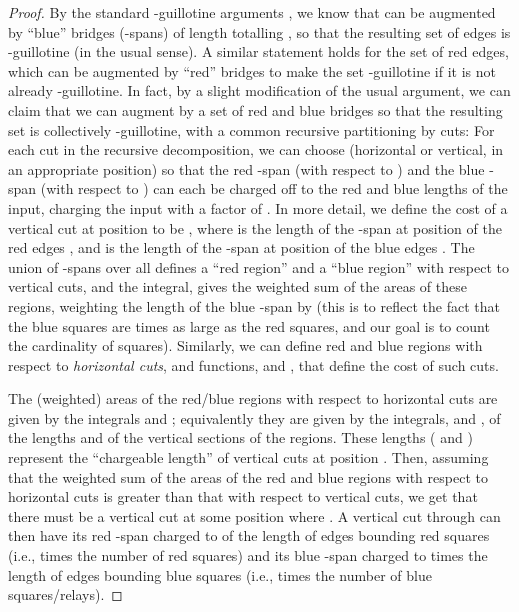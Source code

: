 \documentclass[11pt,a4paper]{article}
\theoremstyle{definition}
\theoremstyle{remark}
\begin{document}
\begin{enumerate}
\begin{proof}
By the standard -guillotine arguments \cite{mitchell99guillotine},
we know that  can be augmented by ``blue'' bridges (-spans) of
length totalling , so that the resulting set of
edges is -guillotine (in the usual sense).  A similar statement
holds for the set  of red edges, which can be augmented by
``red'' bridges to make the set -guillotine if it is not already
-guillotine.  In fact, by a slight modification of the usual
argument, we can claim that we can augment  by a set of
red and blue bridges so that the resulting set is collectively
-guillotine, with a common recursive partitioning by cuts: For each
cut  in the recursive decomposition, we can choose 
(horizontal or vertical, in an appropriate position) so that the red
-span (with respect to ) and the blue -span (with respect
to ) can each be charged off to the red and blue lengths of the
input, charging the input with a factor of .  In more detail,
we define the cost of a vertical cut at position  to be
, where  is the length of the -span at
position  of the red edges , and  is the length of the
-span at position  of the blue edges .  The union of
-spans over all  defines a ``red region'' and a ``blue region''
with respect to vertical cuts, and the integral,  gives the weighted sum of the areas of these
regions, weighting the length of the blue -span by  (this is
to reflect the fact that the blue squares are  times as large as
the red squares, and our goal is to count the cardinality of squares).
Similarly, we can define red and blue regions with respect to {\em
  horizontal cuts}, and functions,  and , that define
the cost of such cuts.

The (weighted) areas of the red/blue regions with respect to
horizontal cuts are given by the integrals  and
; equivalently they are given by the integrals,
 and , of the lengths
 and  of the vertical sections of the regions.  These
lengths ( and ) represent the ``chargeable length'' of
vertical cuts at position .  Then, assuming that the weighted sum
of the areas of the red and blue regions with respect to horizontal
cuts is greater than that with respect to vertical cuts, we get that
there must be a vertical cut at some position  where
.  A vertical
cut through  can then have its red -span charged to 
of the length of edges bounding red squares (i.e.,  times the
number of red squares) and its blue -span charged to 
times the length of edges bounding blue squares (i.e.,  times
the number of blue squares/relays).


\end{proof}
\end{enumerate}
\end{document}
